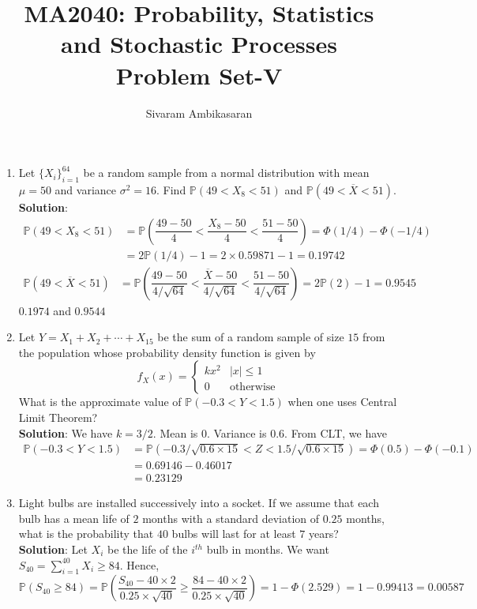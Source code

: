 \documentclass{article}
\title{MA2040: Probability, Statistics and Stochastic Processes\\
Problem Set-V}
\author{Sivaram Ambikasaran}
\newcommand{\dsum}{\displaystyle\sum}
\newcommand{\abs}[1]{\displaystyle\left\lvert#1\right\rvert}
\newcommand{\Pb}{\mathbb{P}}
\newcommand{\soln}[1]{\textbf{Solution}:#1}
\newcommand{\bkt}[1]{\left(#1\right)}
\begin{document}
	\maketitle
	\begin{enumerate}
		\item
		Let $\{X_i\}_{i=1}^{64}$ be a random sample from a normal distribution with mean $\mu = 50$ and variance $\sigma^2=16$. Find $\Pb\bkt{49 < X_8 < 51}$ and $\Pb\bkt{49 < \overline{X} < 51}$.\\
		\soln{
		\begin{align}
			\Pb\bkt{49 < X_8 < 51} & = \Pb\bkt{\dfrac{49-50}4 < \dfrac{X_8-50}4 < \dfrac{51-50}4} = \Phi\bkt{1/4} - \Phi(-1/4)\\
			& = 2\Pb\bkt{1/4}-1 = 2 \times 0.59871-1 = 0.19742
		\end{align}
		\begin{align}
			\Pb\bkt{49 < \overline{X} < 51} & = \Pb\bkt{\dfrac{49-50}{4/\sqrt{64}} < \dfrac{\overline{X}-50}{4/\sqrt{64}} < \dfrac{51-50}{4/\sqrt{64}}} = 2 \Pb\bkt{2}-1 = 0.9545
		\end{align}
		$0.1974$ and $0.9544$
		}
		\item
		Let $Y = X_1+X_2+\cdots+X_{15}$ be the sum of a random sample of size $15$ from the population whose probability density function is given by
		$$f_X(x) = \begin{cases}
		kx^2 & \abs{x} \leq 1\\
		0 & \text{otherwise}
		\end{cases}$$
		What is the approximate value of $\Pb\bkt{-0.3<Y<1.5}$ when one uses Central Limit Theorem?\\
		\soln{
		We have $k=3/2$. Mean is $0$. Variance is $0.6$. From CLT, we have
		\begin{align}
			\Pb\bkt{-0.3<Y<1.5} & = \Pb\bkt{-0.3/\sqrt{0.6 \times 15} < Z < 1.5/\sqrt{0.6 \times 15}} = \Phi\bkt{0.5} - \Phi\bkt{-0.1}\\
			& = 0.69146-0.46017\\
			& = 0.23129
		\end{align}}
		\item
		Light bulbs are installed successively into a socket. If we assume that each bulb has a mean life of $2$ months with a standard deviation of $0.25$ months, what is the probability that $40$ bulbs will last for at least $7$ years?\\
		\soln{
		Let $X_i$ be the life of the $i^{th}$ bulb in months. We want $S_{40} = \dsum_{i=1}^{40}X_i \geq 84$. Hence,
		$$\Pb\bkt{S_{40} \geq 84} = \Pb\bkt{\dfrac{S_{40}-40 \times 2}{0.25 \times \sqrt{40}} \geq \dfrac{84-40 \times 2}{0.25 \times \sqrt{40}}} = 1- \Phi\bkt{2.529} = 1-0.99413 = 0.00587$$
}
\end{enumerate}
\end{document}

